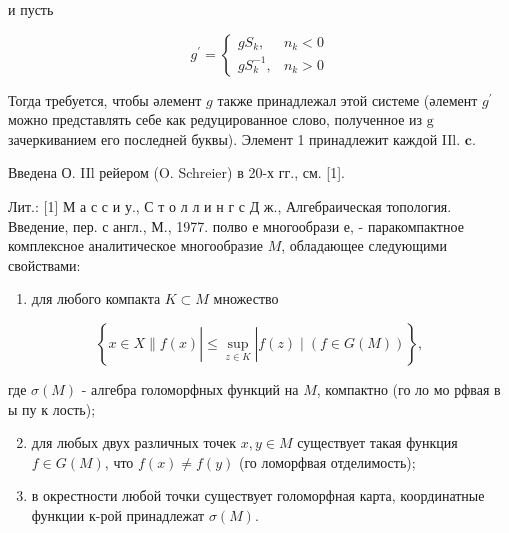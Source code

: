 \documentclass[10pt]{article}
\begin{document}
и пусть



\[

g^{\prime}= \begin{cases}g S_{k}, & n_{k}<0 \\ g S_{k}^{-1}, & n_{k}>0\end{cases}

\]



Тогда требуется, чтобы әлемент $g$ также принадлежал этой системе (әлемент $g^{\prime}$ можно представлять себе как редуцированное слово, полученное из $\mathrm{g}$ зачеркиванием его последней буквы). Элемент 1 принадлежит каждой IIl. $\mathbf{c}$.



Введена О. IIl рейером (O. Schreier) в 20-х гг., см. [1].



Лит.: [1] М а с с и у., С т о л л и н г с Д ж., Алгебраическая топология. Введение, пер. с англ., М., 1977. полво е многообрази е, - паракомпактное комплексное аналитическое многообразие $M$, обладающее следующими свойствами:



\begin{enumerate}

  \item для любого компакта $K \subset M$ множество

\end{enumerate}



\[

\left\{x \in X \| f(x)\left|\leqslant \sup _{z \in K}\right| f(z) \mid(f \in G(M))\right\},

\]



где $\sigma(M)$ - алгебра голоморфных функций на $M$, компактно (го ло мо рфвая в ы пу к лость);



\begin{enumerate}

  \setcounter{enumi}{1}

  \item для любых двух различных точек $x, y \in M$ существует такая функция $f \in G(M)$, что $f(x) \neq f(y)$ (го ломорфвая отделимость);



  \item в окрестности любой точки существует голоморфная карта, координатные функции к-рой принадлежат $\sigma(M)$.



\end{enumerate}
\end{document}
